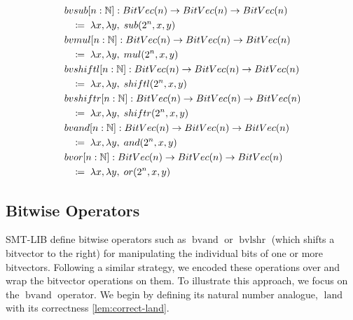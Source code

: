\begin{definition}
\begin{align*}
&\mathop{bvsub}[n : \mathbb{N}] : \mathop{BitVec}(n) \rightarrow \mathop{BitVec}(n) \rightarrow \mathop{BitVec}(n) \\
&\quad\coloneq\; \lambda x, \lambda y, \; \mathop{sub}(2^n, x, y) \\
&\mathop{bvmul}[n : \mathbb{N}] : \mathop{BitVec}(n) \rightarrow \mathop{BitVec}(n) \rightarrow \mathop{BitVec}(n) \\
&\quad\coloneq\; \lambda x, \lambda y, \; \mathop{mul}(2^n, x, y) \\
&\mathop{bvshiftl}[n : \mathbb{N}] : \mathop{BitVec}(n) \rightarrow \mathop{BitVec}(n) \rightarrow \mathop{BitVec}(n) \\
&\quad\coloneq\; \lambda x, \lambda y, \; \mathop{shiftl}(2^n, x, y) \\
&\mathop{bvshiftr}[n : \mathbb{N}] : \mathop{BitVec}(n) \rightarrow \mathop{BitVec}(n) \rightarrow \mathop{BitVec}(n) \\
&\quad\coloneq\; \lambda x, \lambda y, \; \mathop{shiftr}(2^n, x, y) \\
&\mathop{bvand}[n : \mathbb{N}] : \mathop{BitVec}(n) \rightarrow \mathop{BitVec}(n) \rightarrow \mathop{BitVec}(n) \\
&\quad\coloneq\; \lambda x, \lambda y, \; \mathop{and}(2^n, x, y) \\
&\mathop{bvor}[n : \mathbb{N}] : \mathop{BitVec}(n) \rightarrow \mathop{BitVec}(n) \rightarrow \mathop{BitVec}(n) \\
&\quad\coloneq\; \lambda x, \lambda y, \; \mathop{or}(2^n, x, y)
\end{align*}
\end{definition}


\subsection{Bitwise Operators}


SMT-LIB define bitwise operators such as $\mathop{bvand}$ or $\mathop{bvlshr}$  (which shifts a bitvector to the right) for manipulating the individual bits of one or more bitvectors. 
 Following a similar strategy, we encoded these operations over \N and wrap the bitvector operations on them. To illustrate this approach, we focus on the $\mathop{bvand}$ operator.
We begin by defining its natural number analogue, $\mathop{land}$ with its correctness \cref{lem:correct-land}.

